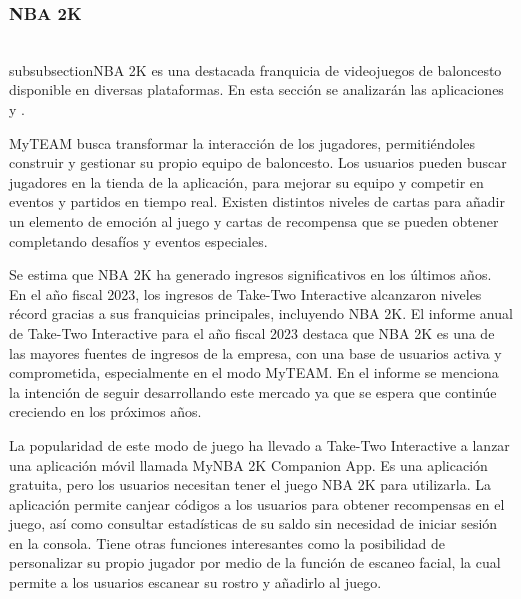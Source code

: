 \subsubsection{NBA 2K}
\\subsubsection{NBA 2K}
 es una destacada franquicia de videojuegos de baloncesto disponible en diversas plataformas. 
En esta sección se analizarán las aplicaciones  y .

MyTEAM busca transformar la interacción de los jugadores, permitiéndoles construir y gestionar su propio equipo de baloncesto. Los usuarios pueden buscar jugadores en la tienda de la aplicación, para mejorar su equipo y competir en eventos y partidos en tiempo real.
Existen distintos niveles de cartas para añadir un elemento de emoción al juego y cartas de recompensa que se pueden obtener completando desafíos y eventos especiales.

Se estima que NBA 2K ha generado ingresos significativos en los últimos años. En el año fiscal 2023, 
los ingresos de Take-Two Interactive alcanzaron niveles récord gracias a sus franquicias principales, incluyendo NBA 2K. El informe anual de Take-Two Interactive para el año fiscal 2023\cite{take_two_2023} 
destaca que NBA 2K es una de las mayores fuentes de ingresos de la empresa, con una base de usuarios activa y comprometida, especialmente en el modo MyTEAM. 
En el informe se menciona la intención de seguir desarrollando este mercado ya que se espera que continúe creciendo en los próximos años.

La popularidad de este modo de juego ha llevado a Take-Two Interactive a lanzar una aplicación móvil llamada MyNBA 2K Companion App. Es una aplicación gratuita, pero los usuarios necesitan tener el juego NBA 2K para utilizarla.
La aplicación permite canjear códigos a los usuarios para obtener recompensas en el juego, así como consultar estadísticas de su saldo sin necesidad de iniciar sesión en la consola.
Tiene otras funciones interesantes como la posibilidad de personalizar su propio jugador por medio de la función de escaneo facial, la cual permite a los usuarios escanear su rostro y añadirlo al juego.


